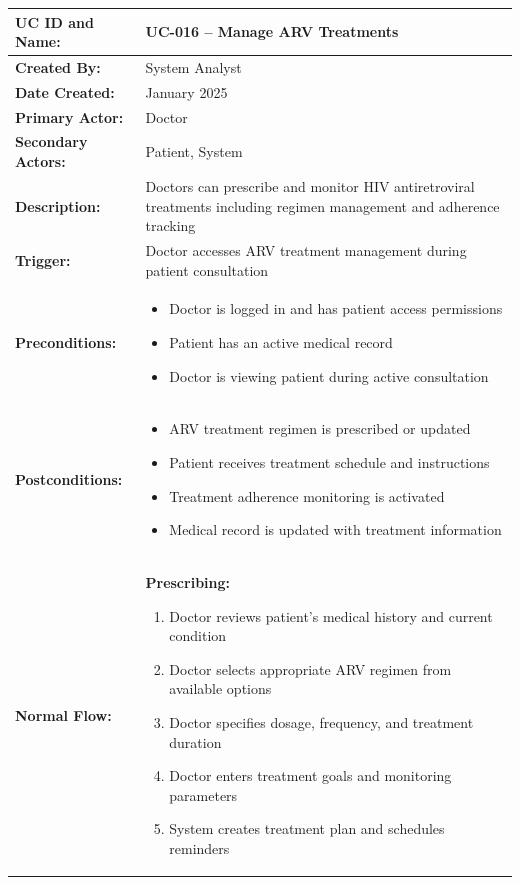 \documentclass[12pt,a4paper]{article}
\begin{document}
\renewcommand{\arraystretch}{1.5}
\begin{longtable}{|p{4.5cm}|p{10.5cm}|}
\hline
\textbf{UC ID and Name:} & UC-016 – Manage ARV Treatments \\
\hline
\textbf{Created By:} & System Analyst \\
\hline
\textbf{Date Created:} & January 2025 \\
\hline
\textbf{Primary Actor:} & Doctor \\
\hline
\textbf{Secondary Actors:} & Patient, System \\
\hline
\textbf{Description:} & Doctors can prescribe and monitor HIV antiretroviral treatments including regimen management and adherence tracking \\
\hline
\textbf{Trigger:} & Doctor accesses ARV treatment management during patient consultation \\
\hline
\textbf{Preconditions:} &
\begin{itemize}
  \item Doctor is logged in and has patient access permissions
  \item Patient has an active medical record
  \item Doctor is viewing patient during active consultation
\end{itemize} \\
\hline
\textbf{Postconditions:} &
\begin{itemize}
  \item ARV treatment regimen is prescribed or updated
  \item Patient receives treatment schedule and instructions
  \item Treatment adherence monitoring is activated
  \item Medical record is updated with treatment information
\end{itemize} \\
\hline
\textbf{Normal Flow:} &
\textbf{Prescribing:}
\begin{enumerate}
  \item Doctor reviews patient's medical history and current condition
  \item Doctor selects appropriate ARV regimen from available options
  \item Doctor specifies dosage, frequency, and treatment duration
  \item Doctor enters treatment goals and monitoring parameters
  \item System creates treatment plan and schedules reminders

\end{enumerate}
\end{longtable}
\end{document}
